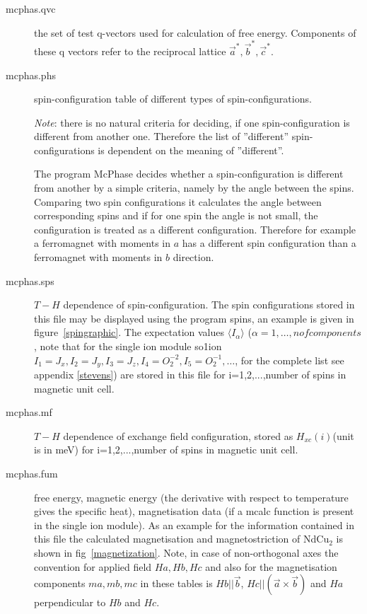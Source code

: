 \begin{description}
\item [\prg mcphas.qvc]    the set of test q-vectors used for calculation of free energy.
                           Components of these q vectors refer to the reciprocal lattice $\vec a^*,\vec b^*,\vec c^*$.
\item [\prg mcphas.phs]    spin-configuration table of different types of spin-configurations. 
                           
                           {\em Note}: 
                           there is no natural criteria for deciding, if one spin-configuration is
			   different from another one. Therefore the list of ''different''
			   spin-configurations is dependent on the meaning of ''different''.
			   
			   The program {\prg McPhase} decides whether a spin-configuration is
			   different from another by a simple criteria, namely by the
			   angle between the spins. Comparing two spin configurations it calculates
			   the angle between corresponding spins and if for one spin the
			   angle is not small, the configuration is treated as a different
			   configuration. Therefore for example a ferromagnet with moments
			   in $a$ has a different spin configuration than a ferromagnet with
			   moments in $b$ direction. 
\item [\prg mcphas.sps]    $T-H$ dependence of spin-configuration. The spin configurations stored in this
                           file may be displayed using the program {\prg spins}, an example is given
			   in figure~\ref{spingraphic}. The expectation values $\langle I_{\alpha} \rangle$ ($\alpha=1,\dots,nofcomponents$, note that for the single ion module {\prg so1ion} $I_1=J_x,I_2=J_y,I_3=J_z,I_4=O_2^{-2},I_5=O_2^{-1}, \dots$, for the complete list see appendix \ref{stevens}) are stored in this file  for i=1,2,...,number of spins in magnetic unit cell.
                            

\item [\prg mcphas.mf]     $T-H$ dependence of exchange field configuration, stored as $H_{xc}(i)$(unit is in meV)
                            for i=1,2,...,number of spins in magnetic unit cell.
                           
\item [\prg mcphas.fum]    free energy, magnetic energy (the derivative with respect to temperature gives the specific heat),
                           magnetisation data (if a {\prg mcalc} function is present in the single ion module).
                            As an example for the information
			   contained in this file the calculated magnetisation and magnetostriction of NdCu$_2$ is shown in
			   fig~\ref{magnetization}.
                            Note, in case of non-orthogonal axes the convention for applied field $Ha, Hb,Hc$ and
                            also for the magnetisation components $ma,mb,mc$ in these tables 
                            is $Hb||\vec b$, $Hc||(\vec a \times \vec b)$ and $Ha$ perpendicular to $Hb$ and $Hc$.


\end{description}
